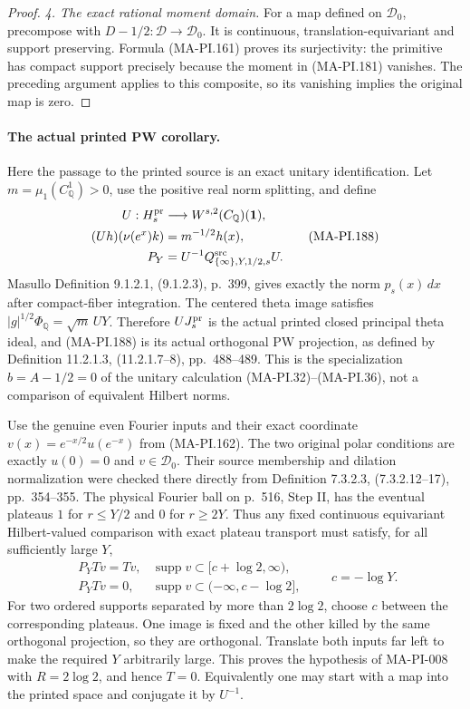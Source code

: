 \begin{proof}
\emph{4. The exact rational moment domain.}
For a map defined on \(\mathcal D_0\), precompose with
\(D-1/2:\mathcal D\to\mathcal D_0\).
It is continuous, translation-equivariant and support
preserving. Formula (MA-PI.161) proves its surjectivity:
the primitive has compact support precisely because the
moment in (MA-PI.181) vanishes. The preceding argument
applies to this composite, so its vanishing implies
the original map is zero.
\end{proof}

\paragraph{The actual printed PW corollary.}
Here the passage to the printed source is an exact unitary
identification. Let \(m=\mu_1(C_{\mathbb Q}^1)>0\), use the
positive real norm splitting, and define
\[
 \begin{aligned}
 U:H_s^{\rm pr}&\longrightarrow
           W^{s,2}(C_{\mathbb Q})(\mathbf1),\\
 (Uh)(\nu(e^x)k)&=m^{-1/2}h(x),\\
 P_Y&=U^{-1}Q^{\rm src}_{\{\infty\},Y,1/2,s}U.
 \end{aligned}
 \tag{MA-PI.188}
\]
Masullo Definition 9.1.2.1, (9.1.2.3), p.~399, gives
exactly the norm \(p_s(x)\,dx\) after compact-fiber integration.
The centered theta image satisfies
\(|g|^{1/2}\Phi_{\mathbb Q}=\sqrt m\,U Y\).
Therefore \(U J_s^{\rm pr}\) is the actual printed closed
principal theta ideal, and (MA-PI.188) is its actual
orthogonal PW projection, as defined by Definition
11.2.1.3, (11.2.1.7--8), pp.~488--489.
This is the specialization \(b=A-1/2=0\) of the unitary
calculation (MA-PI.32)--(MA-PI.36), not a comparison of
equivalent Hilbert norms.

Use the genuine even Fourier inputs and their exact coordinate
\(v(x)=e^{-x/2}u(e^{-x})\) from (MA-PI.162).
The two original polar conditions are exactly \(u(0)=0\)
and \(v\in\mathcal D_0\). Their source membership and
dilation normalization were checked there directly from
Definition 7.3.2.3, (7.3.2.12--17), pp.~354--355.
The physical Fourier ball on p.~516, Step II, has the
eventual plateaus \(1\) for \(r\le Y/2\) and \(0\) for
\(r\ge2Y\). Thus any fixed continuous equivariant
Hilbert-valued comparison with exact plateau transport must
satisfy, for all sufficiently large \(Y\),
\[
 \begin{array}{ll}
 P_YTv=Tv,&\operatorname{supp}v\subset[c+\log2,\infty),\\
 P_YTv=0,&\operatorname{supp}v\subset(-\infty,c-\log2],
 \end{array}
                       \qquad c=-\log Y.
 \tag{MA-PI.189}
\]
For two ordered supports separated by more than \(2\log2\),
choose \(c\) between the corresponding plateaus. One image
is fixed and the other killed by the same orthogonal
projection, so they are orthogonal. Translate both inputs
far left to make the required \(Y\) arbitrarily large.
This proves the hypothesis of MA-PI-008 with \(R=2\log2\),
and hence \(T=0\). Equivalently one may start with a map
into the printed space and conjugate it by \(U^{-1}\).

